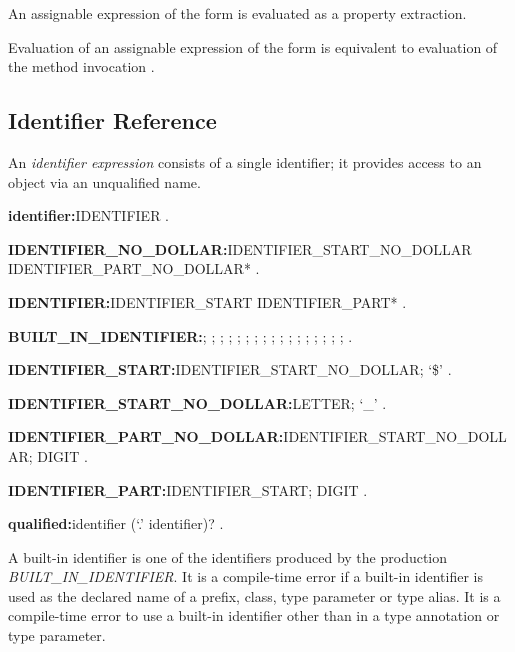 \documentclass{article}
\begin{document}
\LMHash{}
An assignable expression of the form  is evaluated as a property extraction.

\LMHash{}
Evaluation of an assignable expression of the form \code{\SUPER{}[$e_2$]} is equivalent to evaluation of the method invocation .


\subsection{Identifier Reference}

\LMHash{}
An {\em identifier expression} consists of a single identifier; it provides access to an object via an unqualified name.

\begin{grammar}
{\bf identifier:}IDENTIFIER
  .

{\bf IDENTIFIER\_NO\_DOLLAR:}IDENTIFIER\_START\_NO\_DOLLAR
  \gnewline{} IDENTIFIER\_PART\_NO\_DOLLAR*
  .

{\bf IDENTIFIER:}IDENTIFIER\_START IDENTIFIER\_PART*
  .

{\bf BUILT\_IN\_IDENTIFIER:}\ABSTRACT{};
  \AS{};
  \COVARIANT{};
  \DEFERRED{};
  \DYNAMIC{};
  \EXPORT{};
  \EXTERNAL{};
  \FACTORY{};
  \FUNCTION{};
  \GET{};
  \IMPLEMENTS{};
  \IMPORT{};
  \LIBRARY{};
  \OPERATOR{};
  \PART{};
  \SET{};
  \STATIC{};
  \TYPEDEF{}
  .

{\bf IDENTIFIER\_START:}IDENTIFIER\_START\_NO\_DOLLAR;
  `\$'
  .

{\bf IDENTIFIER\_START\_NO\_DOLLAR:}LETTER;
  `\_'
  .

{\bf IDENTIFIER\_PART\_NO\_DOLLAR:}IDENTIFIER\_START\_NO\_DOLLAR;
  DIGIT
  .

{\bf IDENTIFIER\_PART:}IDENTIFIER\_START;
  DIGIT
  .

{\bf qualified:}identifier (`{\escapegrammar .}' identifier)?
  .
\end{grammar}

\LMHash{}
A built-in identifier is one of the identifiers produced by the production {\em BUILT\_IN\_IDENTIFIER}.
It is a compile-time error if a built-in identifier is used as the declared name of a prefix, class, type parameter or type alias.
It is a compile-time error to use a built-in identifier other than \DYNAMIC{} in a type annotation or type parameter.

\end{document}
